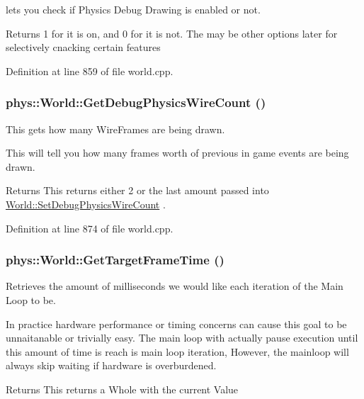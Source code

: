 lets you check if Physics Debug Drawing is enabled or not. \begin{DoxyReturn}{Returns}
1 for it is on, and 0 for it is not. The may be other options later for selectively cnacking certain features 
\end{DoxyReturn}


Definition at line 859 of file world.cpp.

\hypertarget{classphys_1_1World_a1031d596580ac1a8d3593b5be9b49091}{
\subsubsection[{GetDebugPhysicsWireCount}]{ phys::World::GetDebugPhysicsWireCount ()}}
\label{da/ddf/classphys_1_1World_a1031d596580ac1a8d3593b5be9b49091}


This gets how many WireFrames are being drawn. 

This will tell you how many frames worth of previous in game events are being drawn. \begin{DoxyReturn}{Returns}
This returns either 2 or the last amount passed into \hyperlink{classphys_1_1World_a6fa4d1e58a78ba0403af1c003fd321d9}{World::SetDebugPhysicsWireCount} . 
\end{DoxyReturn}


Definition at line 874 of file world.cpp.

\hypertarget{classphys_1_1World_aa063ace52be484c7b03ec5859453f48b}{
\subsubsection[{GetTargetFrameTime}]{ phys::World::GetTargetFrameTime ()}}
\label{da/ddf/classphys_1_1World_aa063ace52be484c7b03ec5859453f48b}


Retrieves the amount of milliseconds we would like each iteration of the Main Loop to be. 

In practice hardware performance or timing concerns can cause this goal to be unnaitanable or trivially easy. The main loop with actually pause execution until this amount of time is reach is main loop iteration, However, the mainloop will always skip waiting if hardware is overburdened. \begin{DoxyReturn}{Returns}
This returns a Whole with the current Value 
\end{DoxyReturn}


